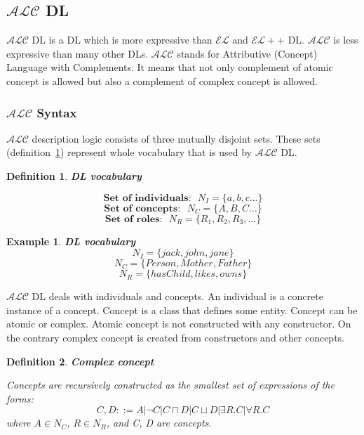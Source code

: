\documentclass[12pt,a4paper]{article}
\newtheorem{definition}{Definition}[subsection]
\newtheorem{example}{Example}[subsection]
\begin{document}
\subsection{$\mathcal{ALC}$ DL}
$\mathcal{ALC}$ DL is a DL which is more expressive than $\mathcal{EL}$ and $\mathcal{EL}{+}{+}$ DL. $\mathcal{ALC}$ is less expressive than many other DLs. $\mathcal{ALC}$ stands for Attributive (Concept) Language with Complements. It means that not only complement of atomic concept is allowed but also a complement of complex concept is allowed.

\subsubsection{$\mathcal{ALC}$ Syntax}
$\mathcal{ALC}$ description logic consists of three mutually disjoint sets. These sets (definition~\ref{def:DLVocabulary}) represent whole vocabulary that is used by $\mathcal{ALC}$ DL.

\begin{definition}{\textbf{DL vocabulary}}
	\label{def:DLVocabulary}
	
	\[ \textbf{Set of individuals:} \text{ } N_{I} = \{a,b,c...\} \]
	\[ \textbf{Set of concepts:} \text{ } N_{C} = \{A,B,C...\} \]
	\[ \textbf{Set of roles:} \text{ } N_{R} = \{R_{1},R_{2},R_{3},...\} \]
\end{definition}

\begin{example}{\textbf{DL vocabulary}}
	\[ N_{I} = \{ jack, john, jane \} \]
	\[ N_{C} = \{ Person, Mother, Father \} \]
	\[ N_{R} = \{ hasChild, likes, owns \} \]
\end{example}

$\mathcal{ALC}$ DL deals with individuals and concepts. An individual is a concrete instance of a concept. Concept is a class that defines some entity. Concept can be atomic or complex. Atomic concept is not constructed with any constructor. On the contrary complex concept is created from constructors and other concepts.

\begin{definition}{\textbf{Complex concept}}
	\label{def:complexConcept}
	
	Concepts are recursively constructed as the smallest set of expressions of the forms:
	\[ C,D ::= A | \neg C | C \sqcap D | C \sqcup D | \exists R.C | \forall R.C \]
	where $A \in N_{C}$, $R \in N_{R}$, and C, D are concepts.
\end{definition}
\end{document}
